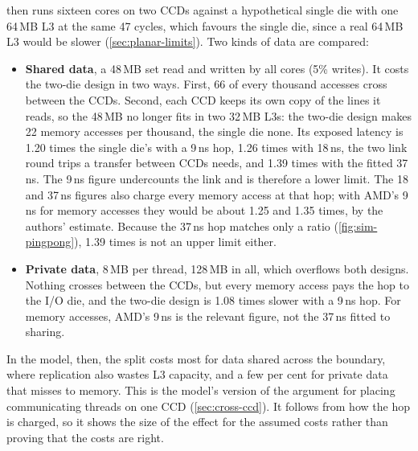 then runs sixteen cores on two CCDs against a hypothetical single die with one 64\,MB L3 at the same 47 cycles, which favours the single die, since a real 64\,MB L3 would be slower (\cref{sec:planar-limits}). Two kinds of data are compared:
\begin{itemize}
  \item \textbf{Shared data}, a 48\,MB set read and written by all cores (5\% writes). It costs the two-die design in two ways. First, 66 of every thousand accesses cross between the CCDs. Second, each CCD keeps its own copy of the lines it reads, so the 48\,MB no longer fits in two 32\,MB L3s: the two-die design makes 22 memory accesses per thousand, the single die none. Its exposed latency is 1.20 times the single die's with a 9\,ns hop, 1.26 times with 18\,ns, the two link round trips a transfer between CCDs needs, and 1.39 times with the fitted 37\,ns. The 9\,ns figure undercounts the link and is therefore a lower limit. The 18 and 37\,ns figures also charge every memory access at that hop; with AMD's 9\,ns for memory accesses they would be about 1.25 and 1.35 times, by the authors' estimate. Because the 37\,ns hop matches only a ratio (\cref{fig:sim-pingpong}), 1.39 times is not an upper limit either.
  \item \textbf{Private data}, 8\,MB per thread, 128\,MB in all, which overflows both designs. Nothing crosses between the CCDs, but every memory access pays the hop to the I/O die, and the two-die design is 1.08 times slower with a 9\,ns hop. For memory accesses, AMD's 9\,ns is the relevant figure, not the 37\,ns fitted to sharing.
\end{itemize}
In the model, then, the split costs most for data shared across the boundary, where replication also wastes L3 capacity, and a few per cent for private data that misses to memory. This is the model's version of the argument for placing communicating threads on one CCD (\cref{sec:cross-ccd}). It follows from how the hop is charged, so it shows the size of the effect for the assumed costs rather than proving that the costs are right.

